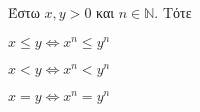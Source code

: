 




\pagestyle{vangelis}





\begin{center}
  \minibox{\large\bfseries\textcolor{Col1}{Πραγματικοί Αριθμοί}}
\end{center}

\vspace{\baselineskip}


\begin{lem}\label{lem:ineqs}
  Έστω $ x,y >0 $ και $ n \in \mathbb{N} $. Τότε
  \begin{enumerate*}[(i)]
    \item $ x \leq y \Leftrightarrow x^{n} \leq y^{n} $
    \item $ x < y \Leftrightarrow x^{n} < y^{n} $ \label{lem:ineqreal2}
    \item $ x = y \Leftrightarrow x^{n} = y^{n} $ \label{lem:ineqreal3}
  \end{enumerate*}
\end{lem}


